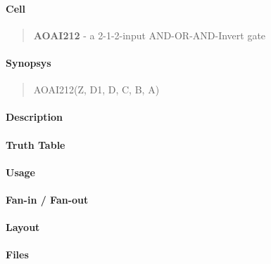 \label{AOAI212}
\paragraph{Cell}
\begin{quote}
    \textbf{AOAI212} - a 2-1-2-input AND-OR-AND-Invert gate
\end{quote}

\paragraph{Synopsys}
\begin{quote}
    AOAI212(Z, D1, D, C, B, A)
\end{quote}

\paragraph{Description}

%

\paragraph{Truth Table}
%

\paragraph{Usage}

\paragraph{Fan-in / Fan-out}

\paragraph{Layout}

\paragraph{Files}
